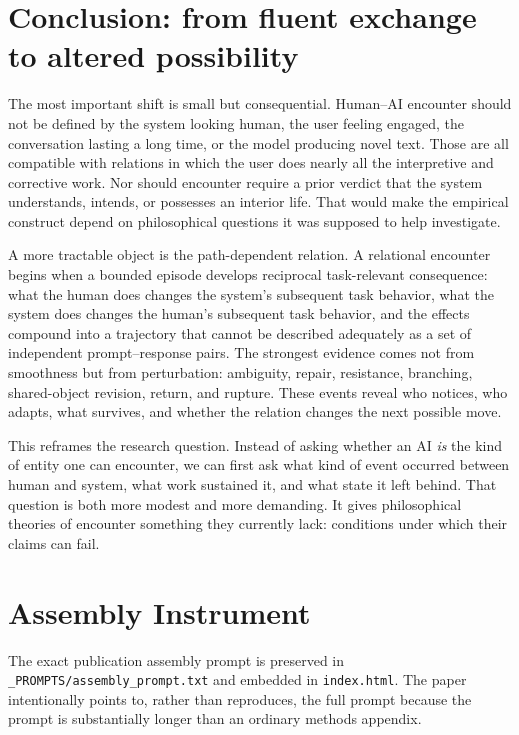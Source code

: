 \documentclass[11pt]{article}
\begin{document}
\section{Conclusion: from fluent exchange to altered possibility}

The most important shift is small but consequential. Human--AI encounter should not be defined by the system looking human, the user feeling engaged, the conversation lasting a long time, or the model producing novel text. Those are all compatible with relations in which the user does nearly all the interpretive and corrective work. Nor should encounter require a prior verdict that the system understands, intends, or possesses an interior life. That would make the empirical construct depend on philosophical questions it was supposed to help investigate.

A more tractable object is the path-dependent relation. A relational encounter begins when a bounded episode develops reciprocal task-relevant consequence: what the human does changes the system's subsequent task behavior, what the system does changes the human's subsequent task behavior, and the effects compound into a trajectory that cannot be described adequately as a set of independent prompt--response pairs. The strongest evidence comes not from smoothness but from perturbation: ambiguity, repair, resistance, branching, shared-object revision, return, and rupture. These events reveal who notices, who adapts, what survives, and whether the relation changes the next possible move.

This reframes the research question. Instead of asking whether an AI \emph{is} the kind of entity one can encounter, we can first ask what kind of event occurred between human and system, what work sustained it, and what state it left behind. That question is both more modest and more demanding. It gives philosophical theories of encounter something they currently lack: conditions under which their claims can fail.

\appendix
\section{Assembly Instrument}
The exact publication assembly prompt is preserved in \texttt{\_PROMPTS/assembly\_prompt.txt} and embedded in \texttt{index.html}. The paper intentionally points to, rather than reproduces, the full prompt because the prompt is substantially longer than an ordinary methods appendix.
\end{document}

